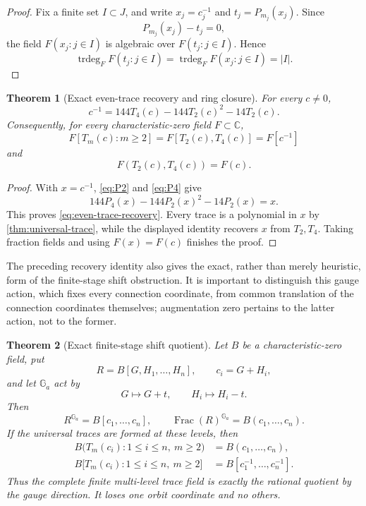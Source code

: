 \documentclass[11pt]{article}
\theoremstyle{keio}
\newtheorem{theorem}{Theorem}[section]
\theoremstyle{definition}
\theoremstyle{remark}
\newcommand{\C}{\mathbb C}
\newcommand{\trdeg}{\operatorname{trdeg}}
\begin{document}
\begin{proof}
Fix a finite set \(I\subset J\), and write
\(x_j=c_j^{-1}\) and \(t_j=P_{m_j}(x_j)\).  Since
\[
 P_{m_j}(x_j)-t_j=0,
\]
the field \(F(x_j:j\in I)\) is algebraic over \(F(t_j:j\in I)\).  Hence
\[
 \trdeg_FF(t_j:j\in I)
 =\trdeg_FF(x_j:j\in I)=|I|.
\]
\end{proof}

\begin{theorem}[Exact even-trace recovery and ring closure]
\label{cor:fixed-level-closure}
For every \(c\ne0\),
\begin{equation}\label{eq:even-trace-recovery}
 \boxed{\displaystyle
 c^{-1}=144T_4(c)-144T_2(c)^2-14T_2(c).}
\end{equation}
Consequently, for every characteristic-zero field \(F\subset\C\),
\[
 \boxed{\displaystyle
 F[T_m(c):m\ge2]
 =F[T_2(c),T_4(c)]
 =F[c^{-1}]}
\]
and
\[
 \boxed{F(T_2(c),T_4(c))=F(c).}
\]
\end{theorem}

\begin{proof}
With \(x=c^{-1}\), \eqref{eq:P2} and \eqref{eq:P4} give
\[
 144P_4(x)-144P_2(x)^2-14P_2(x)=x.
\]
This proves \eqref{eq:even-trace-recovery}.  Every trace is a polynomial in
\(x\) by \cref{thm:universal-trace}, while the displayed identity recovers
\(x\) from \(T_2,T_4\).  Taking fraction fields and using \(F(x)=F(c)\)
finishes the proof.
\end{proof}

The preceding recovery identity also gives the exact, rather than merely
heuristic, form of the finite-stage shift obstruction.  It is important to
distinguish this gauge action, which fixes every connection coordinate,
from common translation of the connection coordinates themselves;
augmentation zero pertains to the latter action, not to the former.

\begin{theorem}[Exact finite-stage shift quotient]
\label{thm:exact-shift-quotient}
Let \(B\) be a characteristic-zero field, put
\[
 R=B[G,H_1,\ldots,H_n],\qquad c_i=G+H_i,
\]
and let \(\mathbb G_a\) act by
\begin{equation}\label{eq:gauge-action}
 G\longmapsto G+t,\qquad H_i\longmapsto H_i-t.
\end{equation}
Then
\begin{equation}\label{eq:shift-invariant-ring}
 \boxed{R^{\mathbb G_a}=B[c_1,\ldots,c_n],\qquad
 \operatorname{Frac}(R)^{\mathbb G_a}=B(c_1,\ldots,c_n).}
\end{equation}
If the universal traces are formed at these levels, then
\begin{align}
 B\bigl(T_m(c_i):1\le i\le n,\ m\ge2\bigr)
 &=B(c_1,\ldots,c_n),\label{eq:trace-invariant-field}\\
 B\bigl[T_m(c_i):1\le i\le n,\ m\ge2\bigr]
 &=B[c_1^{-1},\ldots,c_n^{-1}].\label{eq:trace-invariant-ring}
\end{align}
Thus the complete finite multi-level trace field is exactly the rational
quotient by the gauge direction.  It loses one orbit coordinate and no
others.
\end{theorem}
\end{document}
